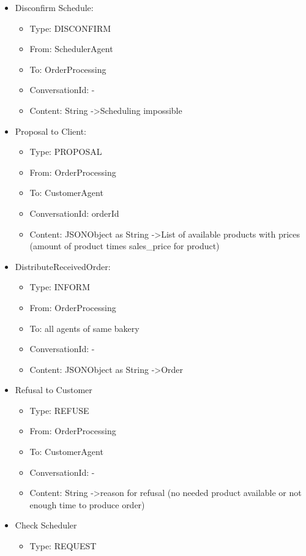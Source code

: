 \documentclass[10pt,a4paper]{article}
\begin{document}
\begin{itemize}
\begin{itemize}
		\end{itemize}
		\item Disconfirm Schedule:
		\begin{itemize}
			\item Type: DISCONFIRM
			\item From: SchedulerAgent
			\item To: OrderProcessing
			\item ConversationId: -
			\item Content: String -\textgreater \glqq Scheduling impossible\grqq
		\end{itemize}
		\item Proposal to Client:
		\begin{itemize}
			\item Type: PROPOSAL
			\item From: OrderProcessing
			\item To: CustomerAgent
			\item ConversationId: {orderId}
			\item Content: JSONObject as String -\textgreater List of available products with prices (amount of product times sales\_price for product)
		\end{itemize}
		\item DistributeReceivedOrder:
		\begin{itemize}
			\item Type: INFORM
			\item From: OrderProcessing
			\item To: all agents of same bakery
			\item ConversationId: -
			\item Content: JSONObject as String -\textgreater Order
		\end{itemize}
		\item Refusal to Customer
		\begin{itemize}
			\item Type: REFUSE
			\item From: OrderProcessing
			\item To: CustomerAgent
			\item ConversationId: -
			\item Content: String -\textgreater reason for refusal (no needed product available or not enough time to produce order)
		\end{itemize}
		\item Check Scheduler
		\begin{itemize}
			\item Type: REQUEST

\end{itemize}
\end{itemize}
\end{document}

